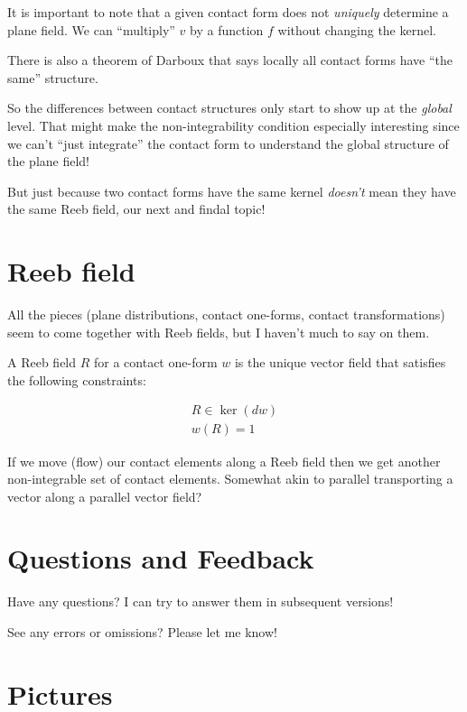 \documentclass{article}
\begin{document}
It is important to note that a given contact form does not \textit{uniquely}
determine a plane field. We can ``multiply'' $v$ by a function $f$ without
changing the kernel.

There is also a theorem of Darboux that says locally all contact forms have
``the same'' structure.

So the differences between contact structures only start to show up at the
\textit{global} level. That might make the non-integrability condition
especially interesting since we can't ``just integrate'' the contact form to understand
the global structure of the plane field!

But just because two contact forms have the same kernel \textit{doesn't} mean
they have the same Reeb field, our next and findal topic!

\section {Reeb field}

All the pieces (plane distributions, contact one-forms, contact transformations)
seem to come together with Reeb fields, but I haven't much to say on them.

A Reeb field $R$ for a contact one-form $w$ is the unique vector field that satisfies the following constraints:

\begin{gather*}
  R \in \ker(dw) \\
  w(R) = 1
\end{gather*}
  
If we move (flow) our contact elements along a Reeb field then we get another
non-integrable set of contact elements. Somewhat akin to parallel transporting a
vector along a parallel vector field?

\newpage

\section {Questions and Feedback}

Have any questions? I can try to answer them in subsequent versions!

See any errors or omissions? Please let me know!

\newpage

\section {Pictures}
\end{document}

